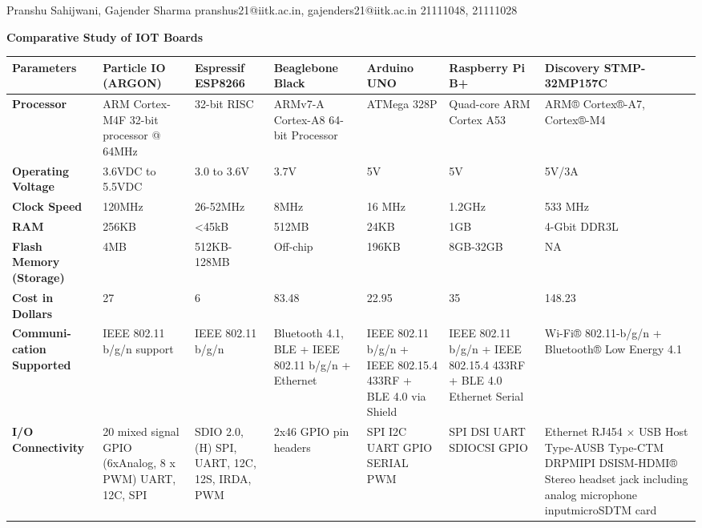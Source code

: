 \documentclass[a4paper,11pt]{article}
\begin{document}
{Pranshu Sahijwani, Gajender Sharma}                    %
{pranshus21@iitk.ac.in, gajenders21@iitk.ac.in}      %
{21111048, 21111028}          %


\begin{iotsolution}


\begin{center}
\caption{\textbf{Comparative Study of IOT Boards}} \label{tab:title} 
\begin{longtable}{|p{2.2cm}|p{1.5cm}|p{1.5cm}|p{2.2cm}|p{2cm}|p{2cm}|p{2cm}|} 

 \hline
 \textbf{Parameters} & Particle IO (ARGON)& Espressif ESP8266 & Beaglebone Black  & Arduino UNO& Raspberry Pi B+ & Discovery STMP-32MP157C \\ [0.5ex] 
 \hline\hline
 \textbf{Processor} & 
ARM Cortex-M4F 32-bit processor @ 64MHz & 32-bit RISC & ARMv7-A Cortex-A8 
64-bit Processor & ATMega 328P & Quad-core ARM Cortex A53 & ARM® Cortex®-A7, Cortex®-M4 \\ 
 \hline
  \textbf{Operating Voltage} & 3.6VDC to 5.5VDC & 3.0 to 3.6V & 3.7V & 5V & 5V & 5V/3A \\
 \hline
  \textbf{Clock Speed} & 120MHz & 26-52MHz & 8MHz & 16 MHz & 1.2GHz & 533 MHz\\
 \hline
  \textbf{RAM} & 256KB & <45kB & 512MB & 24KB & 1GB & 4-Gbit DDR3L\\
 \hline
   \textbf{Flash Memory (Storage)} & 4MB & 512KB-128MB & Off-chip  & 196KB & 8GB-32GB & NA\\
 \hline
\textbf{Cost in Dollars} & 27 & 6 & 83.48 & 22.95 & 35 & 148.23\\
 \hline

\textbf{Communi-cation Supported} & IEEE 802.11 b/g/n support & IEEE 802.11 b/g/n &Bluetooth 4.1, BLE + IEEE 802.11 b/g/n + Ethernet& IEEE 802.11 b/g/n + IEEE 
802.15.4 433RF + BLE 4.0 via 
Shield & IEEE 802.11 b/g/n + IEEE 802.15.4 
433RF + BLE 4.0 Ethernet Serial & Wi-Fi® 802.11-b/g/n + Bluetooth® Low Energy 4.1\\
 \hline

\textbf{I/O Connectivity} & 20 mixed signal GPIO (6xAnalog, 8 x PWM) UART, 12C, SPI & SDIO 2.0, (H) SPI, UART, 12C, 12S, IRDA, PWM & 2x46 GPIO pin headers &SPI I2C UART GPIO SERIAL PWM& SPI DSI UART SDIOCSI GPIO & Ethernet RJ454 × USB Host Type-AUSB Type-CTM DRPMIPI DSISM-HDMI® Stereo headset jack including analog microphone inputmicroSDTM card\\
 \hline


\end{longtable}
\end{center}
\end{iotsolution}
\end{document}
